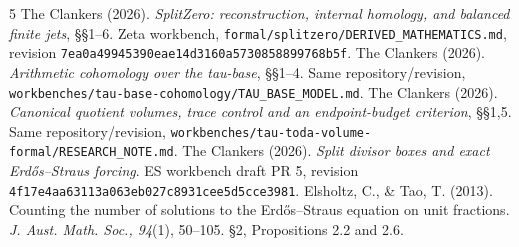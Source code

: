 \documentclass[11pt,a4paper]{article}
\begin{document}
\begingroup\footnotesize
\begin{thebibliography}{5}
 The Clankers (2026). \emph{SplitZero: reconstruction, internal homology, and balanced finite jets}, \S\S1--6. Zeta workbench, \texttt{formal/splitzero/DERIVED\_MATHEMATICS.md}, revision \texttt{7ea0a49945390eae14d3160a5730858899768b5f}.
 The Clankers (2026). \emph{Arithmetic cohomology over the tau-base}, \S\S1--4. Same repository/revision, \texttt{workbenches/tau-base-cohomology/TAU\_BASE\_MODEL.md}.
 The Clankers (2026). \emph{Canonical quotient volumes, trace control and an endpoint-budget criterion}, \S\S1,5. Same repository/revision, \texttt{workbenches/tau-toda-volume-formal/RESEARCH\_NOTE.md}.
 The Clankers (2026). \emph{Split divisor boxes and exact Erd\H{o}s--Straus forcing}. ES workbench draft PR 5, revision \texttt{4f17e4aa63113a063eb027c8931cee5d5cce3981}.
 Elsholtz, C., \& Tao, T. (2013). Counting the number of solutions to the Erd\H{o}s--Straus equation on unit fractions. \emph{J. Aust. Math. Soc., 94}(1), 50--105. \S2, Propositions 2.2 and 2.6.
\end{thebibliography}
\endgroup
\end{document}
